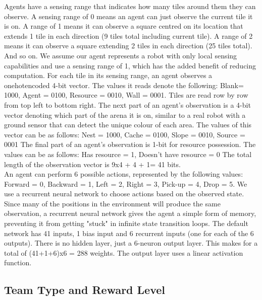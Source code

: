 \documentclass[12pt]{article}
\begin{document}
\begin{appendices}
Agents have a sensing range that indicates how many tiles around them they can observe. 
A sensing range of 0 means an agent can just observe the current tile it is on. 
A range of 1 means it can observe a square centred  on its location that extends 1 tile in each direction (9 tiles total including current tile). 
A range of 2 means it can observe a square extending 2 tiles in each direction (25 tiles total). 
And so on.
We assume our agent represents a robot with only local sensing capabilities and use a sensing range of 1, which has the added benefit of reducing computation.
For each tile in its sensing range, an agent observes a onehotencoded 4-bit vector. 
The values it reads denote the following: Blank= 1000, Agent = 0100, Resource = 0010, Wall = 0001.
Tiles are read row by row from top left to bottom right. 
The next part of an agent's observation is a 4-bit vector denoting which part of the arena it is on, similar to a real robot with a ground sensor that can detect the unique colour of each area.
The values of this vector can be as follows: Nest = 1000, Cache = 0100, Slope = 0010, Source = 0001
The final part of an agent's observation is 1-bit for resource possession. 
The values can be as follows: Has resource = 1, Doesn’t have resource = 0
The total length of the observation vector is 9x4 + 4 + 1= 41 bits.\\

An agent can perform 6 possible actions, represented by the following values: Forward = 0, Backward = 1, Left = 2, Right = 3, Pick-up = 4, Drop = 5.
We use a recurrent neural network to choose actions based on the observed state.
Since many of the positions in the environment will produce the same observation, a recurrent neural network gives the agent a simple form of memory, preventing it from getting "stuck" in infinite state transition loops.
The default network has 41 inputs, 1 bias input and 6 recurrent inputs (one for each of the 6 outputs). 
There is no hidden layer, just a 6-neuron output layer. 
This makes for a total of (41+1+6)x6 = 288 weights. 
The output layer uses a linear activation function.

\subsection{Team Type and Reward Level}\label{rewards}


\end{appendices}
\end{document}
